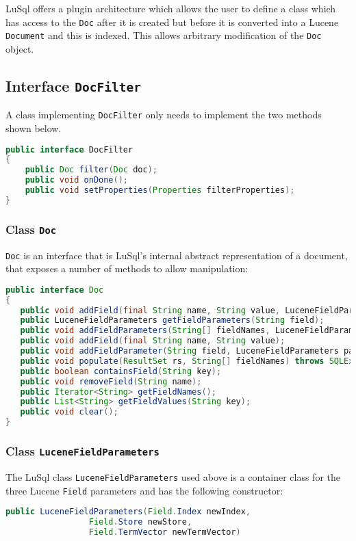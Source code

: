\label{filter}
LuSql offers a plugin architecture which allows the user to define a
class which has access to the {\tt Doc} after it is created but
before it is converted into a Lucene {\tt Document} and this is indexed. 
This allows arbitrary modification of the {\tt Doc} object.


\subsection{Interface {\tt DocFilter}}
A class implementing {\tt DocFilter} only needs to implement the
two methods shown below.
\begin{lstlisting}[backgroundcolor=\color{grey},language=Java]
public interface DocFilter 
{
    public Doc filter(Doc doc); 
    public void onDone();
    public void setProperties(Properties filterProperties);
}
\end{lstlisting}

\subsubsection{Class {\tt Doc}}
\label{doc}
{\tt Doc} is an interface that is LuSql's internal abstract
representation of a document, that exposes a number of methods to allow manipulation:
\begin{lstlisting}[backgroundcolor=\color{grey},language=Java]
public interface Doc 
{
   public void addField(final String name, String value, LuceneFieldParameters lfp);
   public LuceneFieldParameters getFieldParameters(String field);
   public void addFieldParameters(String[] fieldNames, LuceneFieldParameters[] paras);
   public void addField(final String name, String value);
   public void addFieldParameter(String field, LuceneFieldParameters paras);
   public void populate(ResultSet rs, String[] fieldNames) throws SQLException;
   public boolean containsField(String key);
   public void removeField(String name);
   public Iterator<String> getFieldNames();
   public List<String> getFieldValues(String key);
   public void clear();
}
\end{lstlisting}

\subsubsection{Class {\tt LuceneFieldParameters}}
The LuSql class {\tt LuceneFieldParameters} used above is a container class for the
three Lucene {\tt Field} parameters and has the following constructor:
\begin{lstlisting}[backgroundcolor=\color{grey},language=Java]
    public LuceneFieldParameters(Field.Index newIndex,
				 Field.Store newStore,
				 Field.TermVector newTermVector) 
\end{lstlisting}




